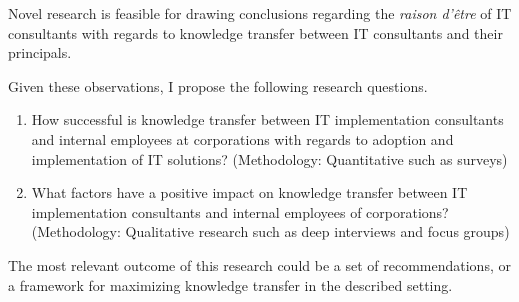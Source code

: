 \documentclass[12pt]{article}
\begin{document}
Novel research is feasible for drawing conclusions regarding the
\emph{raison d'être} of IT consultants with regards to knowledge
transfer between IT consultants and their principals.

Given these observations, I propose the following research questions.

\begin{enumerate}
\def\labelenumi{\arabic{enumi}.}
\item
  How successful is knowledge transfer between IT implementation
  consultants and internal employees at corporations with regards to
  adoption and implementation of IT solutions? (Methodology:
  Quantitative such as surveys)
\item
  What factors have a positive impact on knowledge transfer between IT
  implementation consultants and internal employees of corporations?
  (Methodology: Qualitative research such as deep interviews and focus
  groups)
\end{enumerate}

The most relevant outcome of this research could be a set of
recommendations, or a framework for maximizing knowledge transfer in the
described setting.



\end{document}
